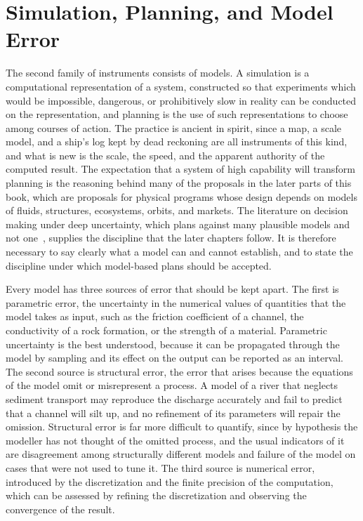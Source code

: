 \chapter{Simulation, Planning, and Model Error}
\label{ch:08}

The second family of instruments consists of models. A simulation is a computational representation of a system, constructed so that experiments which would be impossible, dangerous, or prohibitively slow in reality can be conducted on the representation, and planning is the use of such representations to choose among courses of action. The practice is ancient in spirit, since a map, a scale model, and a ship's log kept by dead reckoning are all instruments of this kind, and what is new is the scale, the speed, and the apparent authority of the computed result. The expectation that a system of high capability will transform planning is the reasoning behind many of the proposals in the later parts of this book, which are proposals for physical programs whose design depends on models of fluids, structures, ecosystems, orbits, and markets. The literature on decision making under deep uncertainty, which plans against many plausible models and not one~\cite{lempert2003}, supplies the discipline that the later chapters follow. It is therefore necessary to say clearly what a model can and cannot establish, and to state the discipline under which model-based plans should be accepted.

Every model has three sources of error that should be kept apart. The first is parametric error, the uncertainty in the numerical values of quantities that the model takes as input, such as the friction coefficient of a channel, the conductivity of a rock formation, or the strength of a material. Parametric uncertainty is the best understood, because it can be propagated through the model by sampling and its effect on the output can be reported as an interval. The second source is structural error, the error that arises because the equations of the model omit or misrepresent a process. A model of a river that neglects sediment transport may reproduce the discharge accurately and fail to predict that a channel will silt up, and no refinement of its parameters will repair the omission. Structural error is far more difficult to quantify, since by hypothesis the modeller has not thought of the omitted process, and the usual indicators of it are disagreement among structurally different models and failure of the model on cases that were not used to tune it. The third source is numerical error, introduced by the discretization and the finite precision of the computation, which can be assessed by refining the discretization and observing the convergence of the result.

